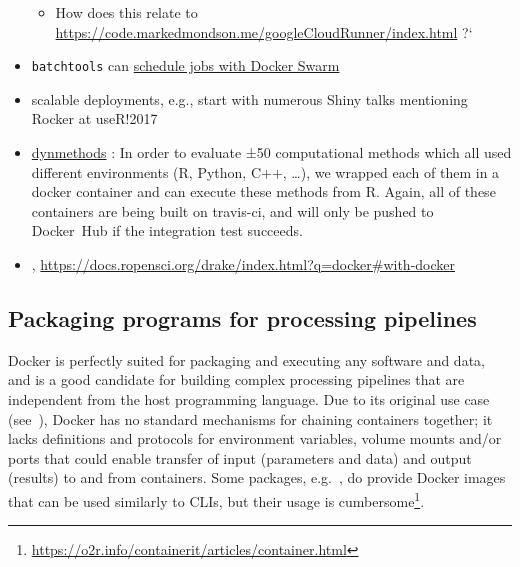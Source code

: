 \begin{itemize}
  \begin{itemize}
  \tightlist
  \item
    How does this relate to
    \url{https://code.markedmondson.me/googleCloudRunner/index.html} ?`
  \end{itemize}
\item
  \texttt{batchtools} \citep{Lang2017batchtools} can
  \href{https://mllg.github.io/batchtools/reference/makeClusterFunctionsDocker.html}{schedule
  jobs with Docker Swarm}
\item
  scalable deployments, e.g., start with numerous Shiny talks mentioning
  Rocker at useR!2017
\item
  \href{https://github.com/dynverse/dynmethods}{dynmethods}
  \citep{rcannood}: In order to evaluate ±50 computational methods which
  all used different environments (R, Python, C++, \ldots{}), we wrapped
  each of them in a docker container and can execute these methods from
  R. Again, all of these containers are being built on travis-ci, and
  will only be pushed to Docker~Hub if the integration test succeeds.
\item
  ,
  \url{https://docs.ropensci.org/drake/index.html?q=docker\#with-docker}
\end{itemize}

\hypertarget{packaging-programs-for-processing-pipelines}{%
\subsection{Packaging programs for processing
pipelines}\label{packaging-programs-for-processing-pipelines}}

\label{packaging}

Docker is perfectly suited for packaging and executing any software and
data, and is a good candidate for building complex processing pipelines
that are independent from the host programming language. Due to its
original use case (see~), Docker has no standard
mechanisms for chaining containers together; it lacks definitions and
protocols for environment variables, volume mounts and/or ports that
could enable transfer of input (parameters and data) and output
(results) to and from containers. Some packages, e.g.~,
do provide Docker images that can be used similarly to CLIs, but their
usage is
cumbersome\footnote{\href{https://o2r.info/containerit/articles/container.html}{https://o2r.info/containerit/articles/container.html}}.

